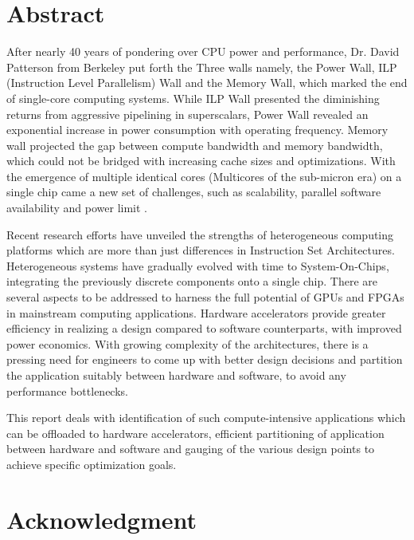 \chapter*{Abstract} 
\label{ch0i_Abstract}

\quad After nearly 40 years of pondering over CPU power and performance, Dr. David Patterson from Berkeley put forth the Three walls namely, the Power Wall, ILP (Instruction Level Parallelism) Wall and the Memory Wall, which marked the end of single-core computing systems\cite{mem_wall}. While ILP Wall presented the diminishing returns from aggressive pipelining in superscalars, Power Wall revealed an exponential increase in power consumption with operating frequency. Memory wall projected the gap between compute bandwidth and memory bandwidth, which could not be bridged with increasing cache sizes and optimizations. With the emergence of multiple identical cores (Multicores of the sub-micron era) on a single chip came a new set of challenges, such as scalability, parallel software availability and power limit \cite{moore2011data}.\newline

Recent research efforts have unveiled the strengths of heterogeneous computing platforms which are more than just differences in Instruction Set Architectures. Heterogeneous systems have gradually evolved with time to System-On-Chips, integrating the previously discrete components onto a single chip. There are several aspects to be addressed to harness the full potential of GPUs and FPGAs in mainstream computing applications. Hardware accelerators provide greater efficiency in realizing a design compared to software counterparts, with improved power economics. With growing complexity of the architectures, there is a pressing need for engineers to come up with better design decisions and partition the application suitably between hardware and software, to avoid any performance bottlenecks. \newline

This report deals with identification of such compute-intensive applications which can be offloaded to hardware accelerators, efficient partitioning of application between hardware and software and gauging of the various design points to achieve specific optimization goals.


\chapter*{Acknowledgment} 
\label{ch0ii_Acknowledgement}


